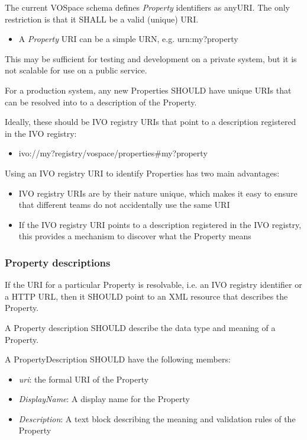 \documentclass[11pt,a4paper]{ivoa}
\begin{document}
The current VOSpace schema defines \emph{Property} identifiers as anyURI. The only restriction is that it SHALL be a valid (unique) URI.

\begin{itemize}
    \item A \emph{Property} URI can be a simple URN, e.g. urn:my?property
\end{itemize}

This may be sufficient for testing and development on a private system, but it is not scalable for use on a public service.

For a production system, any new Properties SHOULD have unique URIs that can be resolved into to a description of the Property.

Ideally, these should be IVO registry URIs that point to a description registered in the IVO registry:

\begin{itemize}
    \item ivo://my?registry/vospace/properties\#my?property
\end{itemize}

Using an IVO registry URI to identify Properties has two main advantages:

\begin{itemize}
    \item IVO registry URIs are by their nature unique, which makes it easy to ensure that different teams do not accidentally use the same URI
    \item If the IVO registry URI points to a description registered in the IVO registry, this provides a mechanism to discover what the Property means
\end{itemize}

\subsubsection{Property descriptions}
If the URI for a particular Property is resolvable, i.e. an IVO registry identifier or a HTTP URL, then it SHOULD point to an XML resource that describes the Property.

A Property description SHOULD describe the data type and meaning of a Property.

A PropertyDescription SHOULD have the following members:

\begin{itemize}
    \item \emph{uri}: the formal URI of the Property
    \item \emph{DisplayName}: A display name for the Property
    \item \emph{Description}: A text block describing the meaning and validation rules of the Property
\end{itemize}
\end{document}
